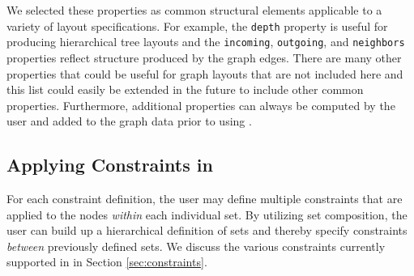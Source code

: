 


We selected these properties as common structural elements
applicable to a variety of layout specifications. For example, the \texttt{depth}
property is useful for producing hierarchical tree layouts and the 
\texttt{incoming}, \texttt{outgoing}, and \texttt{neighbors} properties
reflect structure produced by the graph edges. There are many other
properties that could be useful for graph layouts that are not included 
here and this list could easily be extended in the future to include other
common properties. Furthermore, additional properties can always be
computed by the user and added to the graph data prior to using \projectname.

\subsection{Applying Constraints in \projectname}

For each constraint definition, the user may define multiple constraints
that are applied to the nodes \emph{within} each individual set. 
By utilizing set composition, the user can build up a hierarchical 
definition of sets and thereby specify constraints \emph{between} 
previously defined sets. We discuss the various constraints currently 
supported in \projectname in Section \ref{sec:constraints}.
